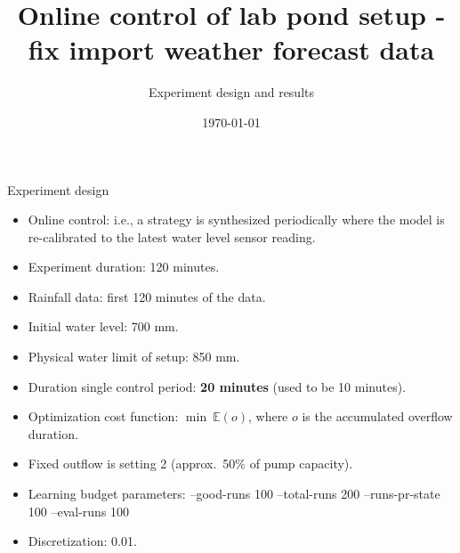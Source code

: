 \documentclass[notheorems,aspectratio=169]{beamer}
\title{Online control of lab pond setup - fix import weather forecast data}
\subtitle{Experiment design and results}
\date{\today}
\begin{document}
%
\begin{frame}
	\titlepage
\end{frame}
%

\begin{frame}{Experiment design}
	\small
	\begin{itemize}
		\item Online control: i.e., a strategy is synthesized periodically where the model is re-calibrated to the latest water level sensor reading.
		\item Experiment duration: 120 minutes.
		\item Rainfall data: first 120 minutes of the data.
		\item Initial water level: 700 mm.
		\item Physical water limit of setup: 850 mm.
		\item Duration single control period: \textbf{20 minutes} (used to be 10 minutes).
		\item Optimization cost function: $\min\  \mathbb{E}(o)$, where $o$ is the accumulated overflow duration.
		\item Fixed outflow is setting 2 (approx.\ 50\% of pump capacity).
		\item Learning budget parameters: --good-runs 100 --total-runs 200 --runs-pr-state 100 --eval-runs 100 
		\item Discretization: 0.01.
	\end{itemize}
\end{frame}
\end{document}
